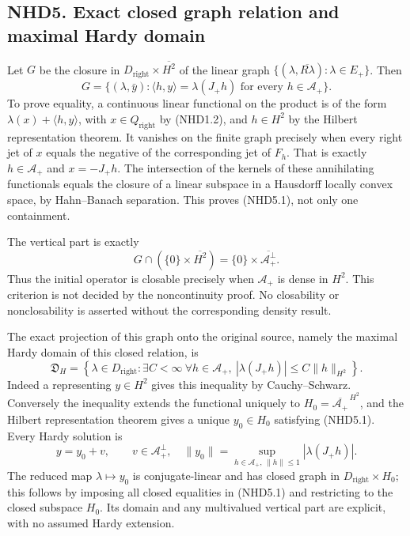 \subsection{NHD5. Exact closed graph relation and maximal Hardy
domain}\label{nhd5.-exact-closed-graph-relation-and-maximal-hardy-domain}

Let \(G\) be the closure in \(D_{\mathrm{right}}\times\overline{H^2}\)
of the linear graph
\(\{(\lambda,\overline{R\lambda}):\lambda\in E_+\}\). Then \[
\boxed{G=\{(\lambda,\bar y):
\langle h,y\rangle=\lambda(J_+h)\text{ for every }h\in\mathscr A_+\}.}
\tag{NHD5.1}
\] To prove equality, a continuous linear functional on the product is
of the form \(\lambda(x)+\langle h,y\rangle\), with
\(x\in Q_{\mathrm{right}}\) by (NHD1.2), and \(h\in H^2\) by the Hilbert
representation theorem. It vanishes on the finite graph precisely when
every right jet of \(x\) equals the negative of the corresponding jet of
\(F_h\). That is exactly \(h\in\mathscr A_+\) and \(x=-J_+h\). The
intersection of the kernels of these annihilating functionals equals the
closure of a linear subspace in a Hausdorff locally convex space, by
Hahn--Banach separation. This proves (NHD5.1), not only one containment.

The vertical part is exactly \[
G\cap(\{0\}\times\overline{H^2})
=\{0\}\times\overline{\mathscr A_+^\perp}.
\tag{NHD5.2}
\] Thus the initial operator is closable precisely when \(\mathscr A_+\)
is dense in \(H^2\). This criterion is not decided by the noncontinuity
proof. No closability or nonclosability is asserted without the
corresponding density result.

The exact projection of this graph onto the original source, namely the
maximal Hardy domain of this closed relation, is \[
\mathfrak D_H=\left\{\lambda\in D_{\mathrm{right}}:
\exists C<\infty\ \forall h\in\mathscr A_+,\
|\lambda(J_+h)|\le C\|h\|_{H^2}\right\}.
\tag{NHD5.3}
\] Indeed a representing \(y\in H^2\) gives this inequality by
Cauchy--Schwarz. Conversely the inequality extends the functional
uniquely to \(H_0=\overline{\mathscr A_+}^{\,H^2}\), and the Hilbert
representation theorem gives a unique \(y_0\in H_0\) satisfying
(NHD5.1). Every Hardy solution is \[
y=y_0+v,\qquad v\in\mathscr A_+^\perp,
\quad
\|y_0\|=\sup_{h\in\mathscr A_+,\,\|h\|\le1}|\lambda(J_+h)|.
\tag{NHD5.4}
\] The reduced map \(\lambda\mapsto y_0\) is conjugate-linear and has
closed graph in \(D_{\mathrm{right}}\times H_0\); this follows by
imposing all closed equalities in (NHD5.1) and restricting to the closed
subspace \(H_0\). Its domain and any multivalued vertical part are
explicit, with no assumed Hardy extension.

